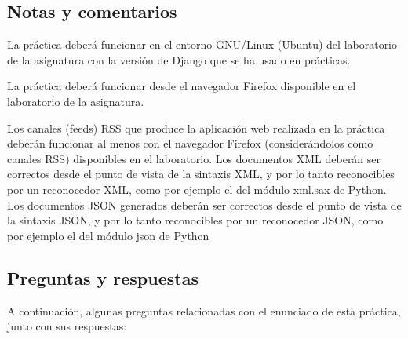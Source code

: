 \subsection{Notas y comentarios}

La práctica deberá funcionar en el entorno GNU/Linux (Ubuntu) del laboratorio de la asignatura con la versión de Django que se ha usado en prácticas.

La práctica deberá funcionar desde el navegador Firefox disponible en el laboratorio de la asignatura.

Los canales (feeds) RSS que produce la aplicación web realizada en la práctica deberán funcionar al menos con el navegador Firefox (considerándolos como canales RSS) disponibles en el laboratorio. Los documentos XML deberán ser correctos desde el punto de vista de la sintaxis XML, y por lo tanto reconocibles por un reconocedor XML, como por ejemplo el del módulo xml.sax de Python. Los documentos JSON generados deberán ser correctos desde el punto de vista de la sintaxis JSON, y por lo tanto reconocibles por un reconocedor JSON, como por ejemplo el del módulo json de Python

\subsection{Preguntas y respuestas}

A continuación, algunas preguntas relacionadas con el enunciado de esta práctica, junto con sus respuestas:

